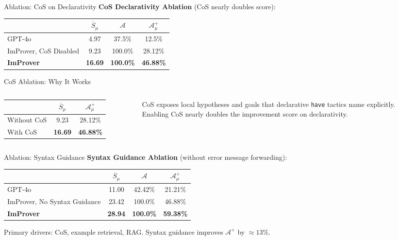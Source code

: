 \documentclass{beamer}
\newcommand{\good}[1]{\textcolor{improverGreen}{\textbf{#1}}}
\begin{document}
\begin{frame}{Ablation: CoS on Declarativity}
\vspace{0.5em}
\textbf{CoS Declarativity Ablation} (CoS nearly doubles score):
\begin{center}
\small
\begin{tabular}{l|ccc}
\toprule
& $\overline{S}_\mu$ & $\mathcal{A}$ & $\mathcal{A}^+_\mu$\\
\midrule
GPT-4o & 4.97 & 37.5\% & 12.5\%\\
ImProver, CoS Disabled & 9.23 & 100.0\% & 28.12\%\\
\textbf{ImProver} & \textbf{16.69} & \textbf{100.0\%} & \textbf{46.88\%}\\
\bottomrule
\end{tabular}
\end{center}
\end{frame}

\begin{frame}{CoS Ablation: Why It Works}
\begin{columns}[T]
\begin{column}{0.50\textwidth}
\begin{tabular}{lcc}
\toprule
& $\overline{S}_\mu$ & $\mathcal{A}^+_\mu$\\
\midrule
Without CoS & 9.23 & 28.12\%\\
With CoS    & \good{16.69} & \good{46.88\%}\\
\bottomrule
\end{tabular}
\end{column}
\begin{column}{0.46\textwidth}
\small CoS exposes local hypotheses and goals that declarative \texttt{have} tactics name explicitly.\\[0.5em]
Enabling CoS nearly doubles the improvement score on declarativity.
\end{column}
\end{columns}
\end{frame}

\begin{frame}{Ablation: Syntax Guidance}
\vspace{0.5em}
\textbf{Syntax Guidance Ablation} (without error message forwarding):
\begin{center}
\small
\begin{tabular}{l|ccc}
\toprule
& $\overline{S}_\mu$ & $\mathcal{A}$ & $\mathcal{A}^+_\mu$\\
\midrule
GPT-4o & 11.00 & 42.42\% & 21.21\%\\
ImProver, No Syntax Guidance & 23.42 & 100.0\% & 46.88\%\\
\textbf{ImProver} & \textbf{28.94} & \textbf{100.0\%} & \textbf{59.38\%}\\
\bottomrule
\end{tabular}
\end{center}
\vspace{0.4em}
\small Primary drivers: CoS, example retrieval, RAG. Syntax guidance improves $\mathcal{A}^+$ by $\approx 13\%$.
\end{frame}
\end{document}
